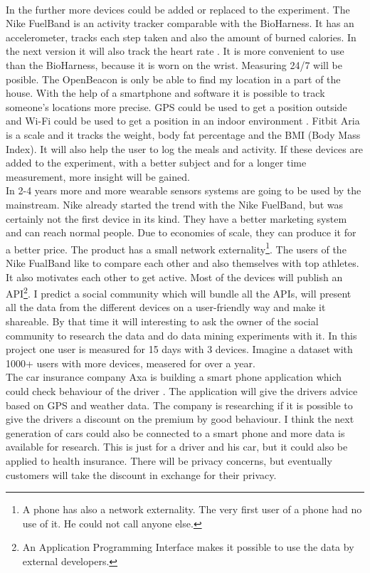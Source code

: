 	\\
	In the further more devices could be added or replaced to the experiment. The Nike FuelBand \cite{fuelband} is an activity tracker comparable with the BioHarness. It has an accelerometer, tracks each step taken and also the amount of burned calories. In the next version it will also track the heart rate \cite{fuelband2}. It is more convenient to use than the BioHarness, because it is worn on the wrist. Measuring 24/7 will be posible. The OpenBeacon is only be able to find my location in a part of the house. With the help of a smartphone and software it is possible to track someone's locations more precise. GPS could be used to get a position outside and Wi-Fi could be used to get a position in an indoor environment \cite{Howard-2003-283}. Fitbit Aria \cite{aria} is a scale and it tracks the weight, body fat percentage and the BMI (Body Mass Index). It will also help the user to log the meals and activity. If these devices are added to the experiment, with a better subject and for a longer time measurement, more insight will be gained.
	\\
	In 2-4 years more and more wearable sensors systems are going to be used by the mainstream. Nike already started the trend with the Nike FuelBand, but was certainly not the first device in its kind. They have a better marketing system and can reach normal people. Due to economies of scale, they can produce it for a better price. The product has a small network externality\footnote{A phone has also a network externality. The very first user of a phone had no use of it. He could not call anyone else.}. The users of the Nike FualBand like to compare each other and also themselves with top athletes. It also motivates each other to get active. Most of the devices will publish an API\footnote{An Application Programming Interface makes it possible to use the data by external developers.}. I predict a social community which will bundle all the APIs, will present all the data from the different devices on a user-friendly way and make it shareable. By that time it will interesting to ask the owner of the social community to research the data and do data mining experiments with it. In this project one user is measured for 15 days with 3 devices. Imagine a dataset with 1000+ users with more devices, measered for over a year.
	\\	
	The car insurance company Axa is building a smart phone application which could check behaviour of the driver \cite{axa}. The application will give the drivers advice based on GPS and weather data. The company is researching if it is possible to give the drivers a discount on the premium by good behaviour. I think the next generation of cars could also be connected to a smart phone and more data is available for research. This is just for a driver and his car, but it could also be applied to health insurance. There will be privacy concerns, but eventually customers will take the discount in exchange for their privacy. 
